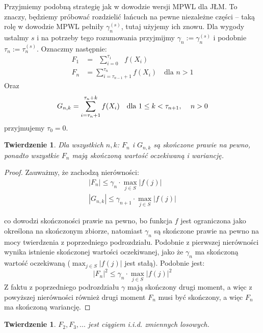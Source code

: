\documentclass[a4paper]{article}
\theoremstyle{defn}
\theoremstyle{theorem}
\newtheorem{theorem}[defn]{Twierdzenie}
\theoremstyle{lemma}
\theoremstyle{cor}
\theoremstyle{fact}
\begin{document}
Przyjmiemy podobną strategię jak w dowodzie wersji MPWL dla JŁM. To znaczy, będziemy próbować rozdzielić łańcuch na pewne niezależne części – taką rolę w dowodzie MPWL pełniły $\gamma_n^{(s)}$, tutaj użyjemy ich znowu. Dla wygody ustalmy $s$ i na potrzeby tego rozumowania przyjmijmy $\gamma_n := \gamma_n^{(s)}$ i podobnie $\tau_n := \tau_n^{(s)}$.
Oznaczmy następnie:
\begin{align*}
    F_1 &= \,\,\,\sum\limits_{i = 0}^{\tau_1} \,\,\,\,f(X_i)\\
    F_n &= \sum\limits_{i = \tau_{n-1}+1}^{\tau_n} f(X_i) \quad \text{dla $n > 1$}
\end{align*}
Oraz
\begin{align*}
    G_{n, k} = \sum\limits_{i = \tau_n+1}^{\tau_n+k} f(X_i) \quad \text{dla $1 \leq k < \tau_{n+1}$, \quad $n > 0$}
\end{align*}
przyjmujemy $\tau_0 = 0$.
\begin{theorem}\label{theorem2.6.2}
Dla wszystkich $n,k$: $F_n$ i $G_{n,k}$ są skończone prawie na pewno, ponadto wszystkie $F_n$ mają skończoną wartość oczekiwaną i wariancję.
\end{theorem}
\begin{proof}
Zauważmy, że zachodzą nierówności:
\begin{align*}
    |F_n| \leq \gamma_n \cdot \max_{j \in S} |f(j)|\\
    |G_{n,k}| \leq \gamma_{n+1} \cdot \max_{j \in S} |f(j)|
\end{align*}

co dowodzi skończoności prawie na pewno, bo funkcja $f$ jest ograniczona jako określona na skończonym zbiorze, natomiast $\gamma_n$ są skończone prawie na pewno na mocy twierdzenia z poprzedniego podrozdziału. Podobnie z pierwszej nierówności wynika istnienie skończonej wartości oczekiwanej, jako że $\gamma_n$ ma skończoną wartość oczekiwaną ($\max_{j \in S} |f(j)|$ jest stałą). Podobnie jest:
$$|F_n|^2 \leq \gamma_n \cdot \max_{j \in S} |f(j)|^2$$
Z faktu z poprzedniego podrozdziału $\gamma$ mają skończony drugi moment, a więc z powyższej nierówności również drugi moment $F_n$ musi być skończony, a więc $F_n$ ma skończoną wariancję.
\end{proof}
\begin{theorem}\label{theorem2.6.3}
$F_2, F_3,...$ jest ciągiem i.i.d. zmiennych losowych.
\end{theorem}
\end{document}
